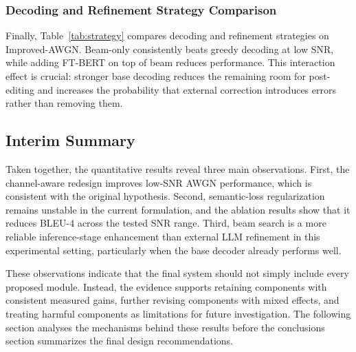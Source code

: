 \subsubsection{Decoding and Refinement Strategy Comparison}


Finally, Table~\ref{tab:strategy} compares decoding and refinement strategies on Improved-AWGN. Beam-only consistently beats greedy decoding at low SNR, while adding FT-BERT on top of beam reduces performance. This interaction effect is crucial: stronger base decoding reduces the remaining room for post-editing and increases the probability that external correction introduces errors rather than removing them.

\FloatBarrier
\subsection{Interim Summary}

Taken together, the quantitative results reveal three main observations. First, the channel-aware redesign improves low-SNR AWGN performance, which is consistent with the original hypothesis. Second, semantic-loss regularization remains unstable in the current formulation, and the ablation results show that it reduces BLEU-4 across the tested SNR range. Third, beam search is a more reliable inference-stage enhancement than external LLM refinement in this experimental setting, particularly when the base decoder already performs well.

These observations indicate that the final system should not simply include every proposed module. Instead, the evidence supports retaining components with consistent measured gains, further revising components with mixed effects, and treating harmful components as limitations for future investigation. The following section analyses the mechanisms behind these results before the conclusions section summarizes the final design recommendations.

